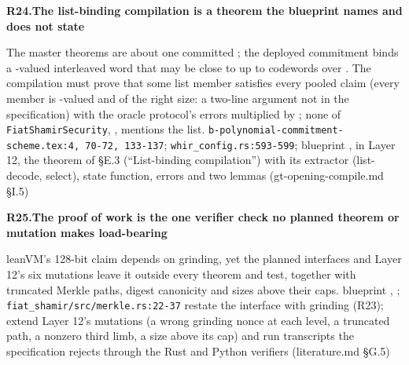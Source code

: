 \par\medskip\noindent\textbf{R24.}\enspace\textbf{The list-binding compilation is a theorem the blueprint names and does not state}\par\nopagebreak
{} The master theorems are about one committed ; the deployed commitment binds a -valued interleaved word that may be close to up to  codewords over . The compilation must prove that some list member satisfies every pooled claim (every member is -valued and of the right size: a two-line argument not in the specification) with the oracle protocol's errors multiplied by ; none of \texttt{Fiat\allowbreak{}Shamir\allowbreak{}Security}, ,  mentions the list.
 \texttt{b-\allowbreak{}polynomial-\allowbreak{}commitment-\allowbreak{}scheme.\allowbreak{}tex:\allowbreak{}4,\allowbreak{} 70-\allowbreak{}72,\allowbreak{} 133-\allowbreak{}137}; \texttt{whir\_\allowbreak{}config.\allowbreak{}rs:\allowbreak{}593-\allowbreak{}599}; blueprint , 
 in Layer 12, the theorem of §E.3 (``List-binding compilation'') with its extractor (list-decode, select), state function, errors and two lemmas (gt-opening-compile.md §I.5)

\par\medskip\noindent\textbf{R25.}\enspace\textbf{The proof of work is the one verifier check no planned theorem or mutation makes load-bearing}\par\nopagebreak
{} leanVM's 128-bit claim depends on grinding, yet the planned interfaces and Layer 12's six mutations leave it outside every theorem and test, together with truncated Merkle paths, digest canonicity and sizes above their caps.
 blueprint , ; \texttt{fiat\_\allowbreak{}shamir/\allowbreak{}src/\allowbreak{}merkle.\allowbreak{}rs:\allowbreak{}22-\allowbreak{}37}
 restate the interface with grinding (R23); extend Layer 12's mutations (a wrong grinding nonce at each level, a truncated path, a nonzero third limb, a size above its cap) and run transcripts the specification rejects through the Rust and Python verifiers (literature.md §G.5)

